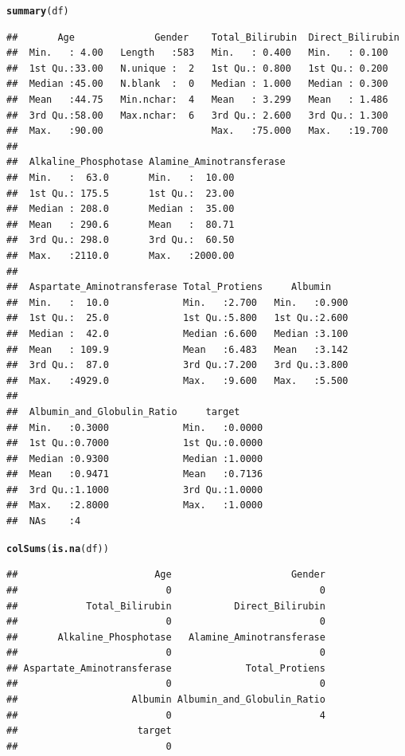 \documentclass[14pt,a4paper]{extarticle}\usepackage[]{graphicx}\usepackage[]{xcolor}
\makeatletter
\newcommand{\hldef}[1]{\textcolor[rgb]{0.345,0.345,0.345}{#1}}%
\newcommand{\hlkwd}[1]{\textcolor[rgb]{0.737,0.353,0.396}{\textbf{#1}}}%
\newenvironment{kframe}{%
 \def\at@end@of@kframe{}%
 \ifinner\ifhmode%
  \def\at@end@of@kframe{\end{minipage}}%
  \begin{minipage}{\columnwidth}%
 \fi\fi%
 \def\FrameCommand##1{\hskip\@totalleftmargin \hskip-\fboxsep
 \colorbox{shadecolor}{##1}\hskip-\fboxsep
     \hskip-\linewidth \hskip-\@totalleftmargin \hskip\columnwidth}%
 \MakeFramed {\advance\hsize-\width
   \@totalleftmargin\z@ \linewidth\hsize
   \@setminipage}}%
 {\par\unskip\endMakeFramed%
 \at@end@of@kframe}
\newenvironment{knitrout}{}{} %
\makeatother
\begin{document}
\begin{knitrout}\scriptsize
{}\color{fgcolor}\begin{kframe}
\begin{alltt}
\hlkwd{summary}\hldef{(df)}
\end{alltt}
\begin{verbatim}
##       Age              Gender    Total_Bilirubin  Direct_Bilirubin
##  Min.   : 4.00   Length   :583   Min.   : 0.400   Min.   : 0.100  
##  1st Qu.:33.00   N.unique :  2   1st Qu.: 0.800   1st Qu.: 0.200  
##  Median :45.00   N.blank  :  0   Median : 1.000   Median : 0.300  
##  Mean   :44.75   Min.nchar:  4   Mean   : 3.299   Mean   : 1.486  
##  3rd Qu.:58.00   Max.nchar:  6   3rd Qu.: 2.600   3rd Qu.: 1.300  
##  Max.   :90.00                   Max.   :75.000   Max.   :19.700  
##                                                                   
##  Alkaline_Phosphotase Alamine_Aminotransferase
##  Min.   :  63.0       Min.   :  10.00         
##  1st Qu.: 175.5       1st Qu.:  23.00         
##  Median : 208.0       Median :  35.00         
##  Mean   : 290.6       Mean   :  80.71         
##  3rd Qu.: 298.0       3rd Qu.:  60.50         
##  Max.   :2110.0       Max.   :2000.00         
##                                               
##  Aspartate_Aminotransferase Total_Protiens     Albumin     
##  Min.   :  10.0             Min.   :2.700   Min.   :0.900  
##  1st Qu.:  25.0             1st Qu.:5.800   1st Qu.:2.600  
##  Median :  42.0             Median :6.600   Median :3.100  
##  Mean   : 109.9             Mean   :6.483   Mean   :3.142  
##  3rd Qu.:  87.0             3rd Qu.:7.200   3rd Qu.:3.800  
##  Max.   :4929.0             Max.   :9.600   Max.   :5.500  
##                                                            
##  Albumin_and_Globulin_Ratio     target      
##  Min.   :0.3000             Min.   :0.0000  
##  1st Qu.:0.7000             1st Qu.:0.0000  
##  Median :0.9300             Median :1.0000  
##  Mean   :0.9471             Mean   :0.7136  
##  3rd Qu.:1.1000             3rd Qu.:1.0000  
##  Max.   :2.8000             Max.   :1.0000  
##  NAs    :4
\end{verbatim}
\begin{alltt}
\hlkwd{colSums}\hldef{(}\hlkwd{is.na}\hldef{(df))}
\end{alltt}
\begin{verbatim}
##                        Age                     Gender 
##                          0                          0 
##            Total_Bilirubin           Direct_Bilirubin 
##                          0                          0 
##       Alkaline_Phosphotase   Alamine_Aminotransferase 
##                          0                          0 
## Aspartate_Aminotransferase             Total_Protiens 
##                          0                          0 
##                    Albumin Albumin_and_Globulin_Ratio 
##                          0                          4 
##                     target 
##                          0
\end{verbatim}
\end{kframe}
\end{knitrout}
\end{document}

